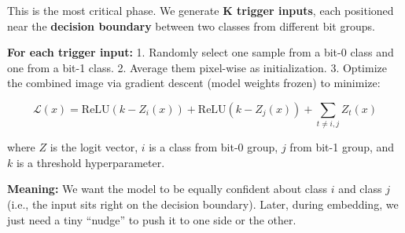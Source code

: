 \documentclass[11pt]{article}
\begin{document}
This is the most critical phase. We generate \textbf{K trigger inputs},
each positioned near the \textbf{decision boundary} between two classes
from different bit groups.

\textbf{For each trigger input:} 1. Randomly select one sample from a
bit-0 class and one from a bit-1 class. 2. Average them pixel-wise as
initialization. 3. Optimize the combined image via gradient descent
(model weights frozen) to minimize:

\[\mathcal{L}(x) = \text{ReLU}(k - Z_i(x)) + \text{ReLU}(k - Z_j(x)) + \sum_{t \neq i,j} Z_t(x)\]

where \(Z\) is the logit vector, \(i\) is a class from bit-0 group,
\(j\) from bit-1 group, and \(k\) is a threshold hyperparameter.

\textbf{Meaning:} We want the model to be equally confident about class
\(i\) and class \(j\) (i.e., the input sits right on the decision
boundary). Later, during embedding, we just need a tiny ``nudge'' to
push it to one side or the other.
\end{document}
